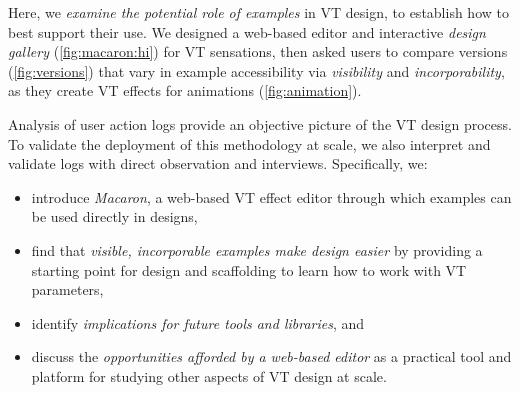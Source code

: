 Here, we \textit{examine the potential role of examples} in VT design, to establish how to best support their use.
We designed a web-based editor and interactive \emph{design gallery} \cite{Lee2010a,Marks1997} (\autoref{fig:macaron:hi}) for VT sensations,
then asked users to compare versions (\autoref{fig:versions}) that vary in example accessibility via \emph{visibility} and \emph{incorporability}, as they create VT effects for animations (\autoref{fig:animation}).

Analysis of user action logs provide an objective picture of the VT design process. To validate the deployment of this methodology at scale, we also interpret and validate logs with direct observation and interviews.
Specifically, we:
\begin{itemize}
\item introduce \textit{Macaron}, a web-based VT effect editor through which examples can be used directly in designs,
\item find that \textit{visible, incorporable examples make design easier} by providing a starting point for design and scaffolding to learn how to work with VT parameters,
\item identify \textit{implications for future tools and libraries}, and
\item discuss the \textit{opportunities afforded by a web-based editor} as a practical tool and platform for studying other aspects of VT design at scale.
\end{itemize}









\newcommand{\macaronBigImageWidth}{0.55\textwidth}
\newcommand{\macaronSmallImageContainerWidth}{0.42\textwidth}
\newcommand{\macaronSmallImageWidth}{0.24\textwidth}


